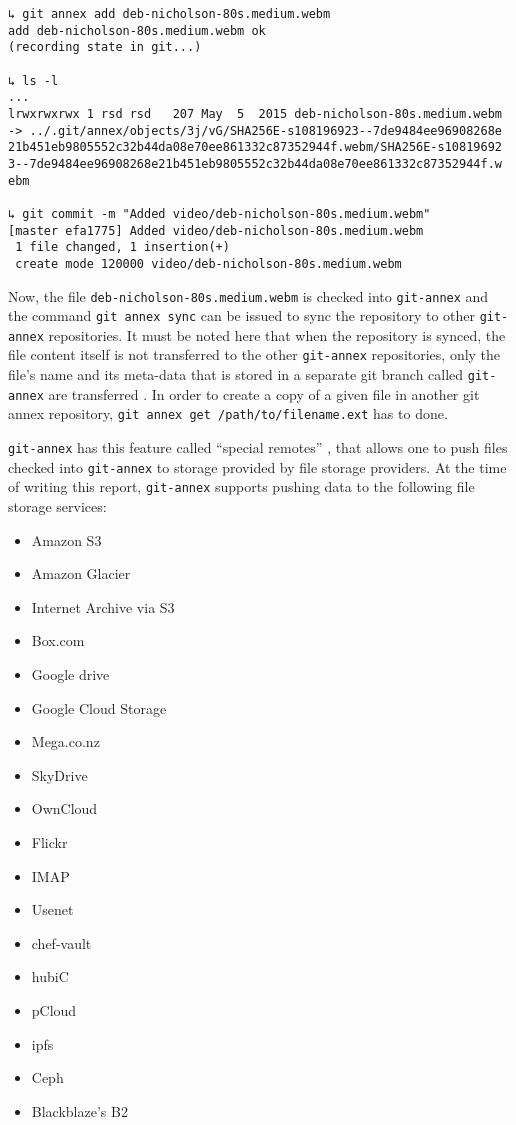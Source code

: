 {\small
\begin{verbatim}
↳ git annex add deb-nicholson-80s.medium.webm
add deb-nicholson-80s.medium.webm ok
(recording state in git...)

↳ ls -l
...
lrwxrwxrwx 1 rsd rsd   207 May  5  2015 deb-nicholson-80s.medium.webm
-> ../.git/annex/objects/3j/vG/SHA256E-s108196923--7de9484ee96908268e
21b451eb9805552c32b44da08e70ee861332c87352944f.webm/SHA256E-s10819692
3--7de9484ee96908268e21b451eb9805552c32b44da08e70ee861332c87352944f.w
ebm

↳ git commit -m "Added video/deb-nicholson-80s.medium.webm"
[master efa1775] Added video/deb-nicholson-80s.medium.webm
 1 file changed, 1 insertion(+)
 create mode 120000 video/deb-nicholson-80s.medium.webm
\end{verbatim}
}

Now, the file \verb+deb-nicholson-80s.medium.webm+ is checked into
\verb+git-annex+ and the command \verb+git annex sync+ can be issued
to sync the repository to other \verb+git-annex+ repositories. It must
be noted here that when the repository is synced, the file content
itself is not transferred to the other \verb+git-annex+ repositories,
only the file's name and its meta-data that is stored in a separate
git branch called \verb+git-annex+ are transferred
\cite{documentation:git-annex-hworks}. In order to create a copy of a
given file in another git annex repository,
\verb+git annex get /path/to/filename.ext+ has to done.

\verb+git-annex+ has this feature called ``special remotes''
\cite{documentation:git-annex-sremotes}, that allows one to push files
checked into \verb+git-annex+ to storage provided by file storage
providers. At the time of writing this report, \verb+git-annex+
supports pushing data to the following file storage services:

{\scriptsize
  \begin{itemize}
  \item Amazon S3
  \item Amazon Glacier
  \item Internet Archive via S3
  \item Box.com
  \item Google drive
  \item Google Cloud Storage
  \item Mega.co.nz
  \item SkyDrive
  \item OwnCloud
  \item Flickr
  \item IMAP
  \item Usenet
  \item chef-vault
  \item hubiC
  \item pCloud
  \item ipfs
  \item Ceph
  \item Blackblaze's B2
  \end{itemize}
}

